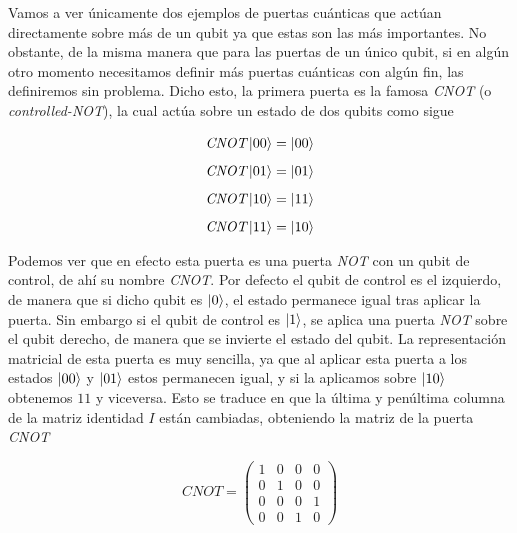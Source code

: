 \documentclass{article}
\numberwithin{equation}{section} %
\begin{document}
    Vamos a ver únicamente dos ejemplos de puertas cuánticas que actúan directamente sobre más de un qubit ya que estas son las más importantes. No obstante, de la misma manera que para las puertas de un único qubit, si en algún otro momento necesitamos definir más puertas cuánticas con algún fin, las definiremos sin problema. Dicho esto, la primera puerta es la famosa \textit{CNOT} (o \textit{controlled-NOT}), la cual actúa sobre un estado de dos qubits como sigue

    \begin{align*}
        \textit{CNOT} \ket{0 0} &= \ket{0 0} \\[5pt]
        \textit{CNOT} \ket{0 1} &= \ket{0 1} \\[5pt]
        \textit{CNOT} \ket{1 0} &= \ket{1 1} \\[5pt]
        \textit{CNOT} \ket{1 1} &= \ket{1 0}
    \end{align*}

    \vspace{2.5mm}

    Podemos ver que en efecto esta puerta es una puerta \textit{NOT} con un qubit de control, de ahí su nombre \textit{CNOT}. Por defecto el qubit de control es el izquierdo, de manera que si dicho qubit es \( \ket{0} \), el estado permanece igual tras aplicar la puerta. Sin embargo si el qubit de control es \( \ket{1} \), se aplica una puerta \textit{NOT} sobre el qubit derecho, de manera que se invierte el estado del qubit. La representación matricial de esta puerta es muy sencilla, ya que al aplicar esta puerta a los estados \( \ket{0 0} \) y \( \ket{0 1} \) estos permanecen igual, y si la aplicamos sobre \( \ket{1 0} \) obtenemos \(1 1\) y viceversa. Esto se traduce en que la última y penúltima columna de la matriz identidad \( I \) están cambiadas, obteniendo la matriz de la puerta \textit{CNOT}
    
    \begin{equation}
        \textit{CNOT} = \begin{pmatrix}
            1 & 0 & 0 & 0 \\
            0 & 1 & 0 & 0 \\
            0 & 0 & 0 & 1 \\
            0 & 0 & 1 & 0
        \end{pmatrix}
        \label{eq: cnot_matriz}
    \end{equation}

    \vspace{2.5mm}
\end{document}
